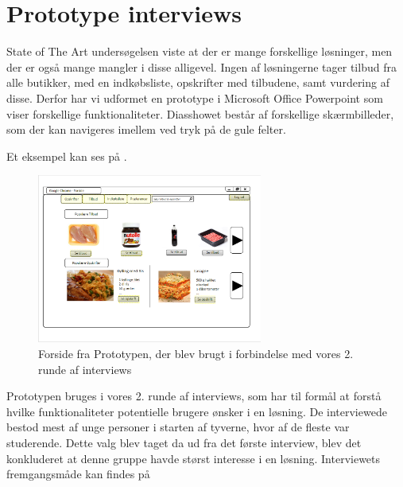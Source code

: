 \section{Prototype interviews}\label{section:interview2}
State of The Art undersøgelsen viste at der er mange forskellige løsninger, men der er også mange mangler i disse alligevel.
Ingen af løsningerne tager tilbud fra alle butikker, med en indkøbsliste, opskrifter med tilbudene, samt vurdering af disse.
Derfor har vi udformet en prototype i Microsoft Office Powerpoint som viser forskellige funktionaliteter. 
Diasshowet består af forskellige skærmbilleder, som der kan navigeres imellem ved tryk på de gule felter.

Et eksempel kan ses på .

\begin{figure}
\vspace{-20pt}
	\begin{center}
		\includegraphics[width=0.66\textwidth]{images/Images/prototype-forside.PNG}
	\end{center}
	\vspace{-20pt}
	\caption{Forside fra Prototypen, der blev brugt i forbindelse med vores 2. runde af interviews}\label{ss:Prototype}
	\vspace{-20pt}
\end{figure}

Prototypen bruges i vores 2. runde af interviews, som har til formål at forstå hvilke funktionaliteter potentielle brugere ønsker i en løsning.
De interviewede bestod mest af unge personer i starten af tyverne, hvor af de fleste var studerende.
Dette valg blev taget da ud fra det første interview, blev det konkluderet at denne gruppe havde størst interesse i en løsning.
Interviewets fremgangsmåde kan findes på 

